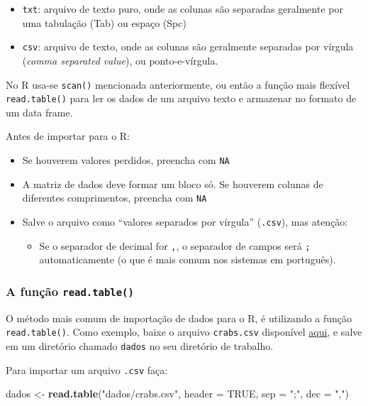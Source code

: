 \documentclass[10pt,a4paper]{book}
\newenvironment{Shaded}{\begin{snugshade}}{\end{snugshade}}
\newcommand{\KeywordTok}[1]{\textcolor[rgb]{0.13,0.29,0.53}{\textbf{#1}}}
\newcommand{\DataTypeTok}[1]{\textcolor[rgb]{0.13,0.29,0.53}{#1}}
\newcommand{\StringTok}[1]{\textcolor[rgb]{0.31,0.60,0.02}{#1}}
\newcommand{\OtherTok}[1]{\textcolor[rgb]{0.56,0.35,0.01}{#1}}
\newcommand{\NormalTok}[1]{#1}
\providecommand{\tightlist}{%
  \setlength{\itemsep}{0pt}\setlength{\parskip}{0pt}}
\begin{document}
\begin{itemize}
\tightlist
\item
  \texttt{txt}: arquivo de texto puro, onde as colunas são separadas
  geralmente por uma tabulação (Tab) ou espaço (Spc)
\item
  \texttt{csv}: arquivo de texto, onde as colunas são geralmente
  separadas por vírgula (\emph{comma separated value}), ou
  ponto-e-vírgula.
\end{itemize}

No R usa-se \texttt{scan()} mencionada anteriormente, ou então a função
mais flexível \texttt{read.table()} para ler os dados de um arquivo
texto e armazenar no formato de um data frame.

Antes de importar para o R:

\begin{itemize}
\tightlist
\item
  Se houverem valores perdidos, preencha com \texttt{NA}
\item
  A matriz de dados deve formar um bloco só. Se houverem colunas de
  diferentes comprimentos, preencha com \texttt{NA}
\item
  Salve o arquivo como ``valores separados por vírgula''
  (\texttt{.csv}), mas atenção:

  \begin{itemize}
  \tightlist
  \item
    Se o separador de decimal for \texttt{,}, o separador de campos será
    \texttt{;} automaticamente (o que é mais comum nos sistemas em
    português).
  \end{itemize}
\end{itemize}

\subsubsection{\texorpdfstring{A função
\texttt{read.table()}}{A função read.table()}}\label{a-funuxe7uxe3o-read.table}

O método mais comum de importação de dados para o R, é utilizando a
função \texttt{read.table()}. Como exemplo, baixe o arquivo
\texttt{crabs.csv} disponível
\href{http://leg.ufpr.br/~fernandomayer/data/crabs.csv}{aqui}, e salve
em um diretório chamado \texttt{dados} no seu diretório de trabalho.

Para importar um arquivo \texttt{.csv} faça:

\begin{Shaded}
\begin{Highlighting}[]
\NormalTok{dados <-}\StringTok{ }\KeywordTok{read.table}\NormalTok{(}\StringTok{"dados/crabs.csv"}\NormalTok{, }\DataTypeTok{header =} \OtherTok{TRUE}\NormalTok{,}
                    \DataTypeTok{sep =} \StringTok{";"}\NormalTok{, }\DataTypeTok{dec =} \StringTok{","}\NormalTok{)}
\end{Highlighting}
\end{Shaded}
\end{document}
